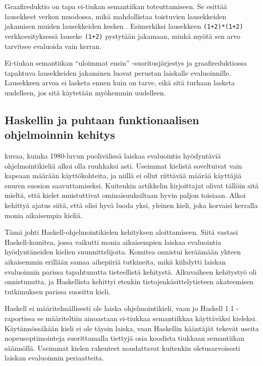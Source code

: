 Graafireduktio on tapa ei-tiukan semantiikan toteuttamiseen. Se esittää lausekkeet verkon muodossa, mikä mahdollistaa toistuvien lausekkeiden jakamisen muiden lausekkeiden kesken \citep{hudak1989conception}. Esimerkiksi lausekkeen \verb!(1+2)*(1+2)! verkkoesityksessä lauseke \verb!(1+2)! pystytään jakamaan, minkä myötä sen arvo tarvitsee evaluoida vain kerran. %

Ei-tiukan semantiikan ``uloimmat ensin'' -suoritusjärjestys ja graafireduktiossa tapahtuva lausekkeiden jakaminen luovat perustan laiskalle evaluoinnille. Lausekkeen arvoa ei lasketa ennen kuin on tarve, eikä sitä turhaan lasketa uudelleen, jos sitä käytetään myöhemmin uudelleen.

\subsection{Haskellin ja puhtaan funktionaalisen ohjelmoinnin kehitys}

\citet{hudak2007history} kuvaa, kuinka 1980-luvun puolivälissä laiskaa evaluointia hyödyntäviä ohjelmointikieliä alkoi olla ruuhkaksi asti. Useimmat kielistä soveltuivat vain kapeaan määrään käyttökohteita, ja niillä ei ollut riittävää määrää käyttäjiä suuren suosion saavuttamiseksi. Kuitenkin artikkelin kirjoittajat olivat tällöin sitä mieltä, että kielet muistuttivat ominaisuuksiltaan hyvin paljon toisiaan. Alkoi kehittyä ajatus siitä, että olisi hyvä luoda yksi, yleinen kieli, joka korvaisi kerralla monia aikaisempia kieliä.

Tämä johti Haskell-ohjelmointikielen kehityksen aloittamiseen. Siitä vastasi Haskell-komitea, jossa vaikutti monia aikaisempien laiskaa evaluointia hyödyntäneiden kielien suunnittelijoita. Komitea onnistui keräämään yhteen aikaisemmin erillään samaa aihepiiriä tutkineita, mikä kiihdytti laiskan evaluoinnin parissa tapahtunutta tieteellistä kehitystä. Alkuvaiheen kehitystyö oli onnistunutta, ja Haskellista kehittyi etenkin tietojenkäsittelytieteen akateemisen tutkimuksen parissa suosittu kieli.

Haskell ei määritelmällisesti ole laiska ohjelmointikieli, vaan jo Haskell 1.1 -raportissa \citep{yale1991report} se määriteltiin ainoastaan ei-tiukkaa semantiikkaa käyttäväksi kieleksi. Käytännössäkään kieli ei ole täysin laiska, vaan Haskellin kääntäjät tekevät useita nopeusoptimointeja suorittamalla tiettyjä osia koodista tiukkaan semantiikan säännöllä. Useimmat kielen rakenteet noudattavat kuitenkin oletusarvoisesti laiskan evaluoinnin periaatteita.


